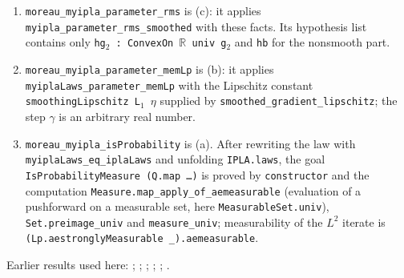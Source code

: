 \documentclass[11pt,a4paper]{article}
\begin{document}
\begin{leanbox}
\begin{enumerate}


\item \texttt{moreau\_\allowbreak{}myipla\_\allowbreak{}parameter\_\allowbreak{}rms} is (c): it applies \texttt{myipla\_\allowbreak{}parameter\_\allowbreak{}rms\_\allowbreak{}smoothed} with these facts. Its hypothesis list contains only \texttt{hg\ensuremath{{}_{2}} : Convex\allowbreak{}On \ensuremath{\mathbb R} univ g\ensuremath{{}_{2}}} and \texttt{hb} for the nonsmooth part.

\item \texttt{moreau\_\allowbreak{}myipla\_\allowbreak{}parameter\_\allowbreak{}mem\allowbreak{}Lp} is (b): it applies \texttt{myipla\allowbreak{}Laws\_\allowbreak{}parameter\_\allowbreak{}mem\allowbreak{}Lp} with the Lipschitz constant \texttt{smoothing\allowbreak{}Lipschitz L\ensuremath{{}_{1}} \ensuremath{\eta}} supplied by \texttt{smoothed\_\allowbreak{}gradient\_\allowbreak{}lipschitz}; the step \texttt{\ensuremath{\gamma}} is an arbitrary real number.

\item \texttt{moreau\_\allowbreak{}myipla\_\allowbreak{}is\allowbreak{}Probability} is (a). After rewriting the law with \texttt{myipla\allowbreak{}Laws\_\allowbreak{}eq\_\allowbreak{}ipla\allowbreak{}Laws} and unfolding \texttt{IPLA.\allowbreak{}laws}, the goal \texttt{Is\allowbreak{}Probability\allowbreak{}Measure (Q.\allowbreak{}map …)} is proved by \texttt{constructor} and the computation \texttt{Measure.\allowbreak{}map\_\allowbreak{}apply\_\allowbreak{}of\_\allowbreak{}aemeasurable} (evaluation of a pushforward on a measurable set, here \texttt{Measurable\allowbreak{}Set.\allowbreak{}univ}), \texttt{Set.\allowbreak{}preimage\_\allowbreak{}univ} and \texttt{measure\_\allowbreak{}univ}; measurability of the \(L^2\) iterate is \texttt{(Lp.\allowbreak{}aestrongly\allowbreak{}Measurable \_\allowbreak{}).\allowbreak{}aemeasurable}.

\end{enumerate}
\end{leanbox}


Earlier results used here: \cite[Section~3.17.4]{LangevinLean2026ULASC}; \cite[Section~3.1.1]{LangevinLean2026IPLA}; \cite[Section~3.1.6]{LangevinLean2026IPLA}; \cite[Section~3.3.1]{LangevinLean2026IPLA}; \cite[Section~3.3.2]{LangevinLean2026IPLA}; \cite[Section~3.3.3]{LangevinLean2026IPLA}.
\end{document}
